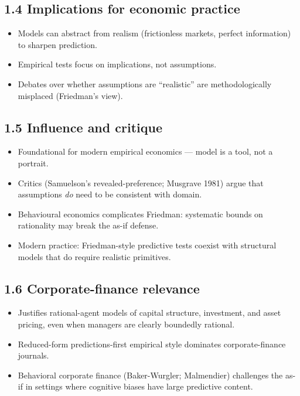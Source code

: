 \documentclass[11pt]{article}
\begin{document}
\subsection*{1.4 Implications for economic practice}
\begin{itemize}
\item Models can abstract from realism (frictionless markets, perfect information) to sharpen prediction.
\item Empirical tests focus on implications, not assumptions.
\item Debates over whether assumptions are ``realistic'' are methodologically misplaced (Friedman's view).
\end{itemize}

\subsection*{1.5 Influence and critique}
\begin{itemize}
\item Foundational for modern empirical economics --- model is a tool, not a portrait.
\item Critics (Samuelson's revealed-preference; Musgrave 1981) argue that assumptions \emph{do} need to be consistent with domain.
\item Behavioural economics complicates Friedman: systematic bounds on rationality may break the as-if defense.
\item Modern practice: Friedman-style predictive tests coexist with structural models that do require realistic primitives.
\end{itemize}

\subsection*{1.6 Corporate-finance relevance}
\begin{itemize}
\item Justifies rational-agent models of capital structure, investment, and asset pricing, even when managers are clearly boundedly rational.
\item Reduced-form predictions-first empirical style dominates corporate-finance journals.
\item Behavioral corporate finance (Baker-Wurgler; Malmendier) challenges the as-if in settings where cognitive biases have large predictive content.
\end{itemize}
\end{document}
